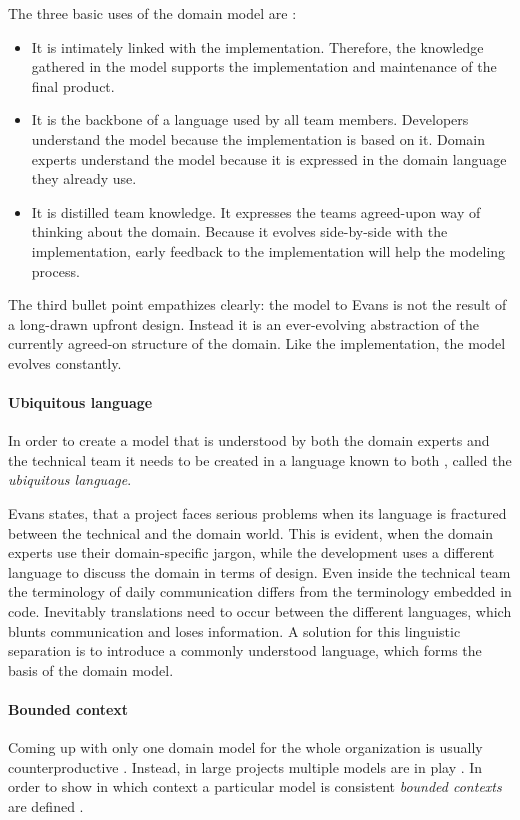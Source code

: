 The three basic uses of the domain model are \citep[p. 3f.]{Evans2004}:
\begin{itemize}
\item  It is intimately linked with the implementation.
Therefore, the knowledge gathered in the model supports the implementation and maintenance of the final product.
\item It is the backbone of a language used by all team members.
Developers understand the model because the implementation is based on it.
Domain experts understand the model because it is expressed in the domain language they already use.
\item It is distilled team knowledge. 
It expresses the teams agreed-upon way of thinking about the domain.
Because it evolves side-by-side with the implementation, early feedback to the implementation will help the modeling process.
\end{itemize}

The third bullet point empathizes clearly: the model to Evans is not the result of a long-drawn upfront design.
Instead it is an ever-evolving abstraction of the currently agreed-on structure of the domain.
Like the implementation, the model evolves constantly.

\paragraph{Ubiquitous language}
\label{bac:ublanguage}
In order to create a model that is understood by both the domain experts and the technical team it needs to be created in a language known to both \citep[p. 32]{Evans2004}, called the \textit{ubiquitous language}.

Evans states, that a project faces serious problems when its language is fractured between the technical and the domain world. 
This is evident, when the domain experts use their domain-specific jargon, while the development uses a different language to discuss the domain in terms of design.
Even inside the technical team the terminology of daily communication differs from the terminology embedded in code.
Inevitably translations need to occur between the different languages, which blunts communication and loses information. \citep[p. 25]{Evans2004}
A solution for this linguistic separation is to introduce a commonly understood language, which forms the basis of the domain model.

\paragraph{Bounded context}
Coming up with only one domain model for the whole organization is usually counterproductive \cite[9:00]{RadioDDD2015}. %
Instead, in large projects multiple models are in play \citep[p. 336]{Evans2004}.
In order to show in which context a particular model is consistent \textit{bounded contexts} are defined
\citep[p. 511]{Evans2004}.


